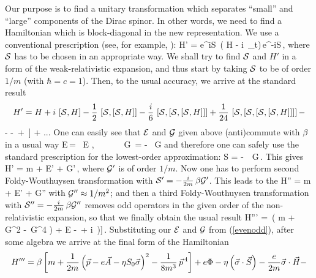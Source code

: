 Our purpose is to find a unitary transformation which separates ``small''
and ``large'' components of the Dirac spinor. In other words, we need to
find a Hamiltonian which is block-diagonal in the new representation.
We use a conventional prescription (see, for example, \cite{BD}):
\beq
H' = e^{i{\cal S}}
\,\left( H - i \,\partial_t\right)\,e^{-i{\cal S}}\,,
\label{gener}
\eeq
where ${\cal S}$ has to be chosen in an appropriate way. We shall try
to find ${\cal S}$ and $H'$ in a form of the weak-relativistic expansion,
and thus start by taking ${\cal S}$ to be of order $1/m$ (with
${\hbar} = c = 1$). Then, to the usual accuracy, we arrive at the
standard result
$$
H' = H + i \,\left[{\cal S},H \right] -
\frac12\,\left[{\cal S}, \left[{\cal S},H \right] \right] -
\frac{i}{6}\,\left[{\cal S}, \left[{\cal S}, \left[{\cal S},H
\right]  \right] \right] +
\frac{1}{24}\,\left[{\cal S}, \left[{\cal S}, \left[{\cal S},
\left[{\cal S},H \right] \right]  \right] \right] -
$$
\beq
- {}
- \, +
\,\left[{\cal S}, \left[{\cal S}, {\dot {\cal S}} \right]\right]
+ ...
\label{expan}
\eeq
One can easily see that ${\cal E}$ and ${\cal G}$ given above
(anti)commute with $\beta$ in a usual way
\beq
{\cal E}\,\be = \be\, {\cal E}
,\,\,\,\,\,\,\,\,\,\,\,\,\,\,\,\,\,\,\,
{\cal G} \,\be = - \be\, {\cal G}
\label{commute}
\eeq
and therefore one can safely use the standard prescription for
the lowest-order approximation:
\beq
{\cal S} = - \,\be \, {\cal G}\,.
\label{anzats}
\eeq
This gives
\beq
H' = \be m + {\cal E}' + {\cal G}'\,,
\label{1ham}
\eeq
where ${\cal G}'$ is of order $1/m$. Now one has to perform
second Foldy-Wouthuysen transformation with
${\cal S}' = - \frac{i}{2m}\,\beta {\cal G}'$. This leads to the
\beq
H'' = \be m + {\cal E}' + {\cal G}''
\label{2ham}
\eeq
with ${\cal G}'' \approx 1/m^2$; and then a third
Foldy-Wouthuysen transformation with
${\cal S}'' = - \frac{i}{2m}\,\beta {\cal G}''$ removes odd operators
in the given order of the non-relativistic
expansion, so that we finally obtain the usual result
\beq
H''' = \be\,\left( m + \,{\cal G}^2 -
\,{\cal G}^4 \right) + {\cal E}
- \,\left[{\cal G}, \left(
\left[{\cal G}, {\cal E}\right] + i\,{} \right)\right]\,.
\label{usual}
\eeq
Substituting our ${\cal E}$ and ${\cal G}$ from (\ref{evenodd}),
after some algebra we arrive at the final form of the Hamiltonian
$$
H''' = \beta \left[ m + \frac{1}{2m}
\left( {\vec p}
- e {\vec A} - \eta S_0 {\vec {\sigma}} \right)^2 
- \frac{1}{8m^3}\,{\vec p}^{\,4} \right] + e\Phi
- \eta \left( {\vec {\sigma}}\cdot{\vec S} \right)
- \frac{e}{2m} {\vec {\sigma}} \cdot {\vec H} -
$$
